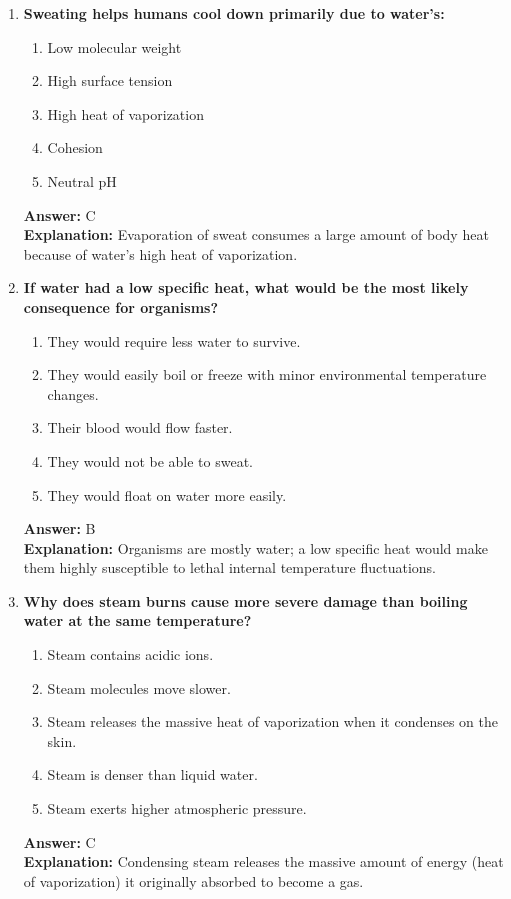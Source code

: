 \documentclass[11pt, a4paper]{article}
\begin{document}
\begin{enumerate}
\item \textbf{Sweating helps humans cool down primarily due to water's:}
\begin{enumerate}[label=\Alph*.]
    \item Low molecular weight
    \item High surface tension
    \item High heat of vaporization
    \item Cohesion
    \item Neutral pH
\end{enumerate}
\textbf{Answer:} C \\
\textbf{Explanation:} Evaporation of sweat consumes a large amount of body heat because of water's high heat of vaporization.

\item \textbf{If water had a low specific heat, what would be the most likely consequence for organisms?}
\begin{enumerate}[label=\Alph*.]
    \item They would require less water to survive.
    \item They would easily boil or freeze with minor environmental temperature changes.
    \item Their blood would flow faster.
    \item They would not be able to sweat.
    \item They would float on water more easily.
\end{enumerate}
\textbf{Answer:} B \\
\textbf{Explanation:} Organisms are mostly water; a low specific heat would make them highly susceptible to lethal internal temperature fluctuations.

\item \textbf{Why does steam burns cause more severe damage than boiling water at the same temperature?}
\begin{enumerate}[label=\Alph*.]
    \item Steam contains acidic ions.
    \item Steam molecules move slower.
    \item Steam releases the massive heat of vaporization when it condenses on the skin.
    \item Steam is denser than liquid water.
    \item Steam exerts higher atmospheric pressure.
\end{enumerate}
\textbf{Answer:} C \\
\textbf{Explanation:} Condensing steam releases the massive amount of energy (heat of vaporization) it originally absorbed to become a gas.


\end{enumerate}
\end{document}
